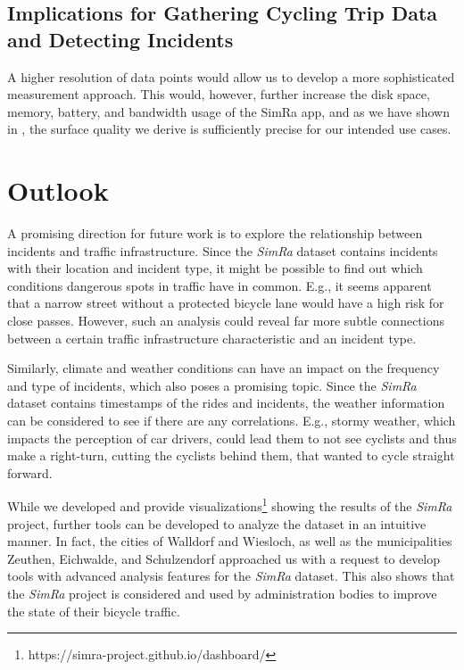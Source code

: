 \subsection*{Implications for Gathering Cycling Trip Data and Detecting Incidents}
A higher resolution of data points would allow us to develop a more sophisticated measurement approach.
This would, however, further increase the disk space, memory, battery, and bandwidth usage of the SimRa app, and as we have shown in , the surface quality we derive is sufficiently precise for our intended use cases.

\section{Outlook}
\label{sec:outlook}
A promising direction for future work is to explore the relationship between incidents and traffic infrastructure.
Since the \textit{SimRa} dataset contains incidents with their location and incident type, it might be possible to find out which conditions dangerous spots in traffic have in common.
E.g., it seems apparent that a narrow street without a protected bicycle lane would have a high risk for close passes.
However, such an analysis could reveal far more subtle connections between a certain traffic infrastructure characteristic and an incident type.

Similarly, climate and weather conditions can have an impact on the frequency and type of incidents, which also poses a promising topic.
Since the \textit{SimRa} dataset contains timestamps of the rides and incidents, the weather information can be considered to see if there are any correlations.
E.g., stormy weather, which impacts the perception of car drivers, could lead them to not see cyclists and thus make a right-turn, cutting the cyclists behind them, that wanted to cycle straight forward.

While we developed and provide visualizations\footnote{https://simra-project.github.io/dashboard/} showing the results of the \textit{SimRa} project, further tools can be developed to analyze the dataset in an intuitive manner.
In fact, the cities of Walldorf and Wiesloch, as well as the municipalities Zeuthen, Eichwalde, and Schulzendorf approached us with a request to develop tools with advanced analysis features for the \textit{SimRa} dataset.
This also shows that the \textit{SimRa} project is considered and used by administration bodies to improve the state of their bicycle traffic.
 